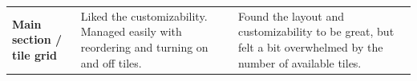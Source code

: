\documentclass{imc-inf}
\begin{document}
\begin{longtable}{@{}>{\raggedright\arraybackslash}p{3cm}p{5.75cm}p{5.75cm}@{}}
  \textbf{Main section / tile grid}                                                                                                                                                                                                                                                                                                                                                                                                                                                                                                                                                                                                                                                                                                                                                                                                                                                                            &
  Liked the customizability. Managed easily with reordering and turning on and off tiles.                                                                                                                                                                                                                                                                                                                                                                                                                                                                                                                                                                                                                                                                                                                                                                                                                      &
  Found the layout and customizability to be great, but felt a bit overwhelmed by the number of available tiles.                                                                                                                                                                                                                                                                                                                                                                                                                                                                                                                                                                                                                                                                                                                                                                                                                                           \\[6pt]


\end{longtable}
\end{document}
